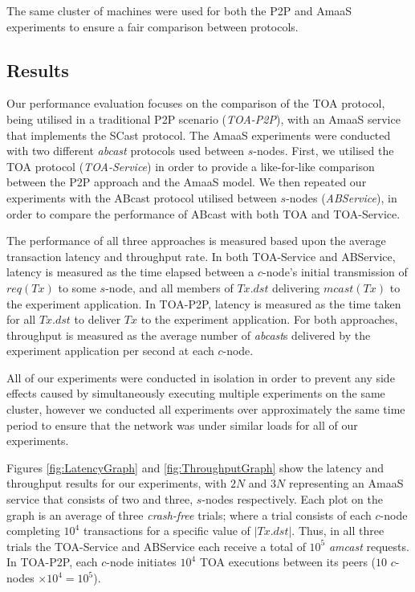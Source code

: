 	The same cluster of machines were used for both the P2P and \textsf{AmaaS} experiments to ensure a fair comparison between protocols.   
	
	\subsection{Results}\label{sec:AmaaS_results}
	Our performance evaluation focuses on the comparison of the TOA protocol, being utilised in a traditional P2P scenario (\emph{TOA-P2P}), with an \textsf{AmaaS} service that implements the \textsf{SCast} protocol.  The \textsf{AmaaS} experiments were conducted with two different \emph{abcast} protocols used between $s$-nodes.  First, we utilised the TOA protocol (\emph{TOA-Service}) in order to provide a like-for-like comparison between the P2P approach and the \textsf{AmaaS} model. We then repeated our experiments with the \textsf{ABcast} protocol utilised between $s$-nodes (\emph{ABService}), in order to compare the performance of \textsf{ABcast} with both TOA and TOA-Service.  
    
    The performance of all three approaches is measured based upon the average transaction latency and throughput rate. In both TOA-Service and ABService, latency is measured as the time elapsed between a $c$-node's initial transmission of $req(Tx)$ to some $s$-node, and all members of $Tx.dst$ delivering $mcast(Tx)$ to the experiment application. In TOA-P2P, latency is measured as the time taken for all $Tx.dst$ to deliver $Tx$ to the experiment application. For both approaches, throughput is measured as the average number of \emph{abcast}s delivered by the experiment application per second at each $c$-node.
	
	All of our experiments were conducted in isolation in order to prevent any side effects caused by simultaneously executing multiple experiments on the same cluster, however we conducted all experiments over approximately the same time period to ensure that the network was under similar loads for all of our experiments. 
	
	Figures \ref{fig:LatencyGraph} and \ref{fig:ThroughputGraph} show the latency and throughput results for our experiments, with $2N$ and $3N$ representing an \textsf{AmaaS} service that consists of two and three, $s$-nodes respectively.  Each plot on the graph is an average of three \emph{crash-free} trials; where a trial consists of each $c$-node completing $10^4$ transactions for a specific value of $|Tx.dst|$. Thus, in all three trials the TOA-Service and ABService each receive a total of $10^5$ \emph{amcast} requests. In TOA-P2P, each $c$-node initiates $10^4$ TOA executions between its peers ($10$ $c$-nodes $\times 10^4 = 10^5$).  
	
